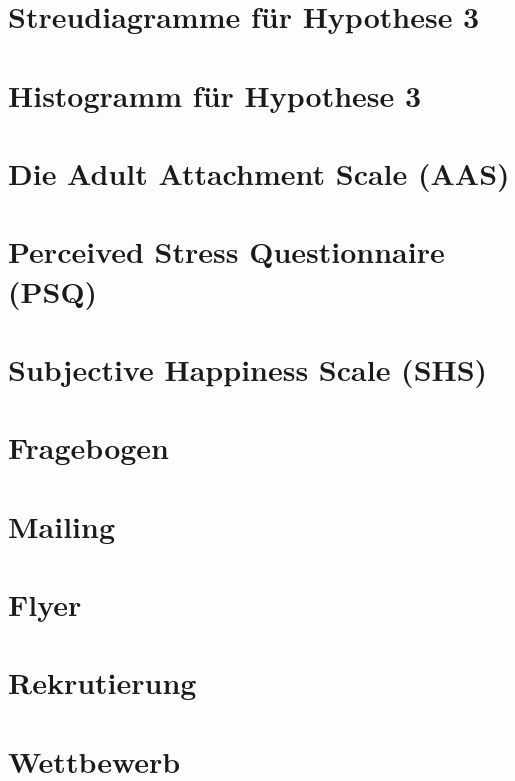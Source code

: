 \section{Streudiagramme für Hypothese 3}\label{app:Hypo3_Streudiagramm}

\newpage
\section{Histogramm für Hypothese 3}\label{app:Hypo3_Histogramm}

\newpage

\section{Die Adult Attachment Scale (AAS)}\label{app:AAS}

\newpage

\section{Perceived Stress Questionnaire (PSQ)}\label{app:PSQ}

\newpage

\section{Subjective Happiness Scale (SHS)}\label{app:SHS}

\newpage

\section{Fragebogen}\label{app:Fragebogen}

\newpage

\section{Mailing}\label{app:Mailing}

\newpage

\section{Flyer}\label{app:Flyer}

\newpage

\section{Rekrutierung}\label{app:Rekrutierung}

\newpage

\section{Wettbewerb}\label{app:Wettbewerb}

\newpage





%
%
%
